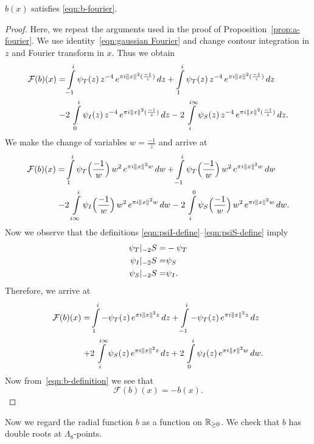 \begin{proposition}\label{prop:b-fourier}\leanok
$b(x)$ satisfies \eqref{eqn:b-fourier}.
\end{proposition}
\begin{proof}
Here, we repeat the arguments used in the proof of Proposition~\ref{prop:a-fourier}.
We use identity~\eqref{eqn:gaussian Fourier} and change contour integration in $z$ and Fourier transform in $x$. Thus we obtain
\begin{align}
    \mathcal{F}(b)(x)= & \int\limits_{-1}^{i}\psi_T(z)\,z^{-4}\,e^{\pi i \|x\|^2 (\frac{-1}{z})}\,dz
        + \int\limits_{1}^{i}\psi_T(z)\,z^{-4}\,e^{\pi i \|x\|^2 (\frac{-1}{z})}\,dz \notag \\
    -& 2\,\int\limits_{0}^{i}\psi_I(z)\,z^{-4}\,e^{\pi i \|x\|^2 (\frac{-1}{z})}\,dz
    - 2\,\int\limits_{i}^{i\infty}\psi_S(z)\,z^{-4}\,e^{\pi i \|x\|^2 (\frac{-1}{z})}\,dz. \notag
\end{align}
We make the change of variables $w=\frac{-1}{z}$ and arrive at
\begin{align}
    \mathcal{F}(b)(x)= & \int\limits_{1}^{i}\psi_T\Big(\frac{-1}{w}\Big)\,w^{2}\,e^{\pi i \|x\|^2 w}\,dw
        + \int\limits_{-1}^{i}\psi_T\Big(\frac{-1}{w}\Big)\,w^{2}\,e^{\pi i \|x\|^2 w}\,dw \notag \\
    -& 2\,\int\limits_{i\infty}^{i}\psi_I\Big(\frac{-1}{w}\Big)\,w^{2}\,e^{\pi i \|x\|^2 w}\,dw
    - 2\,\int\limits_{i}^{0}\psi_S\Big(\frac{-1}{w}\Big)\,w^{2}\,e^{\pi i \|x\|^2 w}\,dw.\notag
\end{align}
Now we observe that the definitions \eqref{eqn:psiI-define}--\eqref{eqn:psiS-define} imply
\begin{align}
    \psi_T|_{-2}S=&-\psi_T \notag \\
    \psi_I|_{-2}S=&\psi_S \notag \\
    \psi_S|_{-2}S=&\psi_I. \notag
\end{align}
Therefore, we arrive at
\begin{align}
    \mathcal{F}(b)(x)= & \int\limits_{1}^{i}-\psi_T(z)\,e^{\pi i \|x\|^2 z}\,dz
        + \int\limits_{-1}^{i}-\psi_T(z)\,e^{\pi i \|x\|^2 z}\,dz \notag \\
    +& 2\,\int\limits_{i}^{i\infty}\psi_S(z)\,e^{\pi i \|x\|^2 z}\,dz
    + 2\,\int\limits_{0}^{i}\psi_I(z)\,e^{\pi i \|x\|^2 w}\,dw.\notag
\end{align}
Now from~\eqref{eqn:b-definition} we see that
$$ \mathcal{F}(b)(x)=-b(x). $$
\end{proof}
Now we regard the radial function $b$ as a function on $\mathbb{R}_{\geq0}$. We check that $b$ has double roots at $\Lambda_8$-points.

